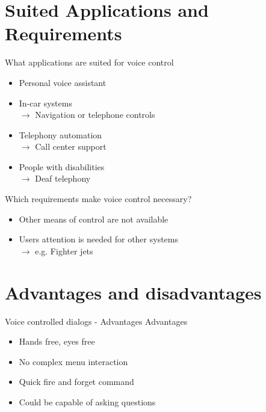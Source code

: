 \documentclass[
  10pt
, handout
]{beamer}
\begin{document}
\section{Suited Applications and Requirements}  %

\begin{frame}{What applications are suited for voice control}
  \begin{itemize}
    \item Personal voice assistant
    \item In-car systems \\
        $\rightarrow$ Navigation or telephone controls
    \item Telephony automation \\
        $\rightarrow$ Call center support
    \item People with disabilities \\
        $\rightarrow$ Deaf telephony
  \end{itemize}
\end{frame}

\begin{frame}{Which requirements make voice control necessary?}
  \begin{itemize}
    \item Other means of control are not available
    \item Users attention is needed for other systems \\
        $\rightarrow$ e.g. Fighter jets
  \end{itemize}
\end{frame}

\section{Advantages and disadvantages}  %

\begin{frame}{Voice controlled dialogs - Advantages}
  Advantages

  \begin{itemize}
    \item<1-> Hands free, eyes free
    \item<2-> No complex menu interaction
    \item<3-> Quick fire and forget command
    \item<4-> Could be capable of asking questions
  \end{itemize}
\end{frame}
\end{document}
